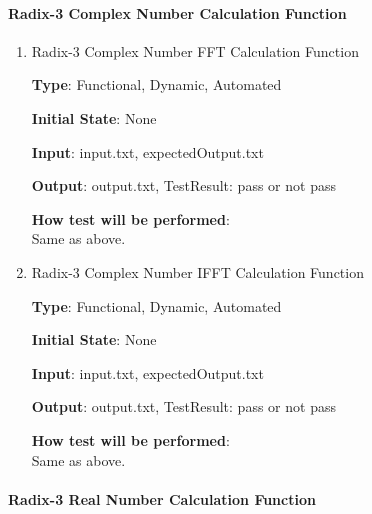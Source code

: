 \documentclass[12pt, titlepage]{article}
\begin{document}
\paragraph{Radix-3 Complex Number Calculation Function\\}

\begin{enumerate}

\item{Radix-3 Complex Number FFT Calculation Function\\}

\textbf {Type}: Functional, Dynamic, Automated

\textbf {Initial State}: None
					
\textbf {Input}: input.txt, expectedOutput.txt
					
\textbf {Output}:  output.txt, TestResult: pass or not pass
					
\textbf {How test will be performed}: \\
Same as above.

\item{Radix-3 Complex Number IFFT Calculation Function\\}

\textbf {Type}: Functional, Dynamic, Automated
					
\textbf {Initial State}: None
					
\textbf {Input}: input.txt, expectedOutput.txt
					
\textbf {Output}:  output.txt, TestResult: pass or not pass

\textbf {How test will be performed}: \\
Same as above.
\end{enumerate}

\paragraph{Radix-3 Real Number Calculation Function\\}
\end{document}
